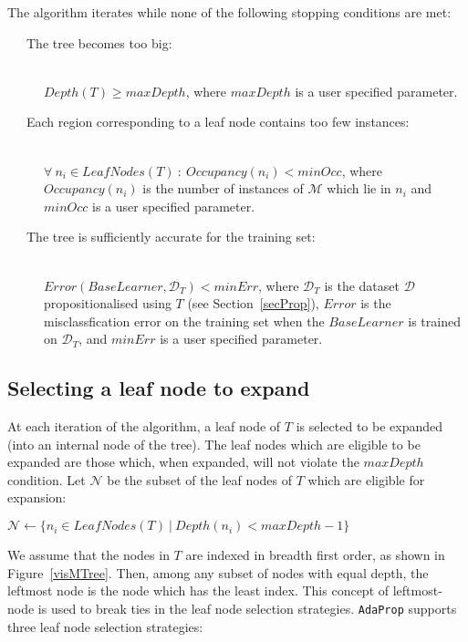 \documentclass[a4paper,12pt]{report} %
\newcommand{\AdaProp}{\texttt{AdaProp}\xspace}
\newcommand{\mcl}[1]{\mathcal{#1}}
\begin{document}
The algorithm iterates while none of the following stopping conditions are met:
\begin{description}

\item[~~~The tree becomes too big:] \ \\
    $Depth(T) \geq maxDepth$, 
    where  $maxDepth$ is a user specified parameter.
\item[~~~Each region corresponding to a leaf node contains too few instances:] \ \\ 
    $\forall~n_i \in LeafNodes(T) ~:~ Occupancy(n_i) < minOcc$, 
    where $Occupancy(n_i)$ is the number of instances of $\mcl{M}$ which lie in $n_i$ and
    $minOcc$ is a user specified parameter.
\item[~~~The tree is sufficiently accurate for the training set:] \ \\
    $Error(BaseLearner, \mcl{D}_T) < minErr$, 
    where $\mcl{D}_T$ is the dataset $\mcl{D}$ propositionalised using $T$ (see Section~\ref{secProp}),
    $Error$ is the misclassfication error on the training set when 
    the $BaseLearner$ is trained on $\mcl{D}_T$,
    and $minErr$ is a user specified parameter.

\end{description}

\subsection{Selecting a leaf node to expand}
\label{secTreeBuild}

At each iteration of the algorithm, 
    a leaf node of $T$ is selected to be expanded 
    (into an internal node of the tree).
The leaf nodes which are eligible to be expanded
    are those which, when expanded, will not 
    violate the $maxDepth$ condition.
Let $\mcl{N}$ be the subset of the leaf nodes of $T$ 
    which are eligible for expansion:
\begin{algorithmic}
    \State $\mcl{N} \gets \{ n_i \in LeafNodes(T) ~\big|~ Depth(n_i) < maxDepth - 1 \} $
\end{algorithmic}
We assume that the nodes in $T$ are indexed in breadth first order, 
    as shown in Figure~\ref{visMTree}.
Then, among any subset of nodes with equal depth,
    the leftmost node is the node which has the least index.
This concept of leftmost-node is used to break ties in the 
    leaf node selection strategies.    
\AdaProp supports three leaf node selection strategies:
\end{document}

